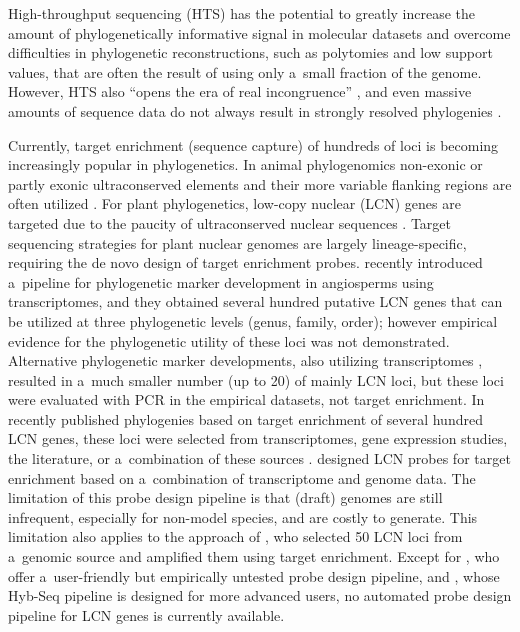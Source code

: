 \documentclass[a4paper, 11pt, twoside]{article}
\begin{document}
High-throughput sequencing (HTS) has the potential to greatly increase the amount of phylogenetically informative signal in molecular datasets \citep{Parks2009, Parks2012} and overcome difficulties in phylogenetic reconstructions, such as polytomies and low support values, that are often the result of using only a~small fraction of the genome. However, HTS also “opens the era of real incongruence” \citep{Jeffroy2006}, and even massive amounts of sequence data do not always result in strongly resolved phylogenies \citep{Pyron2015}.

Currently, target enrichment (sequence capture) of hundreds of loci is becoming increasingly popular in phylogenetics. In animal phylogenomics non-exonic or partly exonic ultraconserved elements and their more variable flanking regions are often utilized \citep[e.g.][]{Faircloth2012, Hedtke2013, Smith2014}. For plant phylogenetics, low-copy nuclear (LCN) genes are targeted \citep{Mandel2014, Weitemier2014, Grover2015, Heyduk2015, Mandel2015, Nicholls2015, Stephens2015a, Stephens2015} due to the paucity of ultraconserved nuclear sequences \citep{Reneker2012}. Target sequencing strategies for plant nuclear genomes are largely lineage-specific, requiring the de novo design of target enrichment probes. \citet{Chamala2015a} recently introduced a~pipeline for phylogenetic marker development in angiosperms using transcriptomes, and they obtained several hundred putative LCN genes that can be utilized at three phylogenetic levels (genus, family, order); however empirical evidence for the phylogenetic utility of these loci was not demonstrated. Alternative phylogenetic marker developments, also utilizing transcriptomes \citep{Pillon2014, Rothfels2013, Tonnabel2014}, resulted in a~much smaller number (up to 20) of mainly LCN loci, but these loci were evaluated with PCR in the empirical datasets, not target enrichment. In recently published phylogenies based on target enrichment of several hundred LCN genes, these loci were selected from transcriptomes, gene expression studies, the literature, or a~combination of these sources \citep{Mandel2014, Grover2015, Heyduk2015, Mandel2015, Nicholls2015, Stephens2015a, Stephens2015}. \citet{Weitemier2014} designed LCN probes for target enrichment based on a~combination of transcriptome and genome data. The limitation of this probe design pipeline is that (draft) genomes are still infrequent, especially for non-model species, and are costly to generate. This limitation also applies to the approach of \citet{DeSousa2014}, who selected 50 LCN loci from a~genomic source and amplified them using target enrichment. Except for \citet{Chamala2015a}, who offer a~user-friendly but empirically untested probe design pipeline, and \citet{Weitemier2014}, whose Hyb-Seq pipeline is designed for more advanced users, no automated probe design pipeline for LCN genes is currently available.
\end{document}
